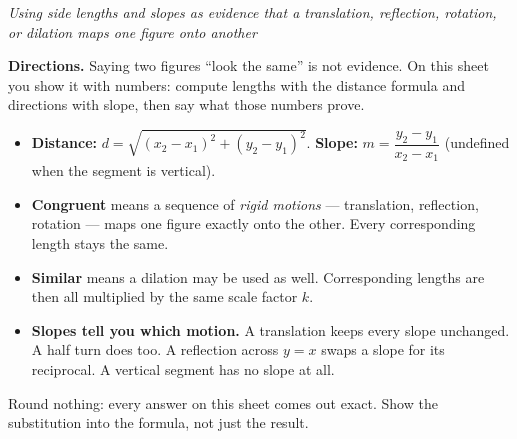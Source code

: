\documentclass[12pt]{article}
\begin{document}

\begin{center}
\textit{Using side lengths and slopes as evidence that a translation,
reflection, rotation, or dilation maps one figure onto another}
\end{center}

\noindent\textbf{Directions.} Saying two figures ``look the same'' is not
evidence. On this sheet you show it with numbers: compute lengths with the
distance formula and directions with slope, then say what those numbers prove.

\begin{itemize}[leftmargin=1.2cm, itemsep=2pt, topsep=3pt]
\item \textbf{Distance:} $d = \sqrt{(x_2 - x_1)^2 + (y_2 - y_1)^2}$. \quad
\textbf{Slope:} $m = \dfrac{y_2 - y_1}{x_2 - x_1}$ (undefined when the segment
is vertical).
\item \textbf{Congruent} means a sequence of \emph{rigid motions} ---
translation, reflection, rotation --- maps one figure exactly onto the other.
Every corresponding length stays the same.
\item \textbf{Similar} means a dilation may be used as well. Corresponding
lengths are then all multiplied by the same scale factor $k$.
\item \textbf{Slopes tell you which motion.} A translation keeps every slope
unchanged. A half turn does too. A reflection across $y = x$ swaps a slope for
its reciprocal. A vertical segment has no slope at all.
\end{itemize}

\vspace{0.1cm}
\noindent Round nothing: every answer on this sheet comes out exact. Show the
substitution into the formula, not just the result.


\end{document}

